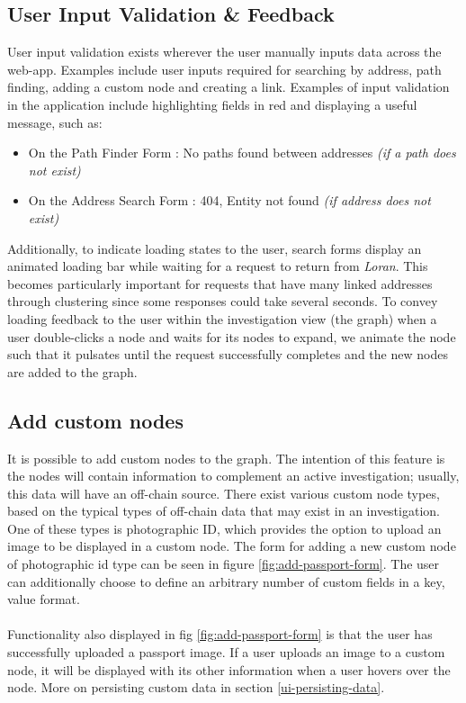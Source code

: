 \subsection{User Input Validation \& Feedback}
User input validation exists wherever the user manually inputs data across the web-app. Examples include user inputs required for searching by address, path finding, adding a custom node and creating a link. Examples of input validation in the application include highlighting fields in red and displaying a useful message, such as:
\begin{itemize}
    \item On the Path Finder Form : No paths found between addresses \textit{(if a path does not exist)}
    \item On the Address Search Form : 404, Entity not found \textit{(if address does not exist)}
\end{itemize}

Additionally, to indicate loading states to the user, search forms display an animated loading bar while waiting for a request to return from \textit{Loran}. This becomes particularly important for requests that have many linked addresses through clustering since some responses could take several seconds. To convey loading feedback to the user within the investigation view (the graph) when a user double-clicks a node and waits for its nodes to expand, we animate the node such that it pulsates until the request successfully completes and the new nodes are added to the graph. 

\subsection{Add custom nodes}
It is possible to add custom nodes to the graph. The intention of this feature is the nodes will contain information to complement an active investigation; usually, this data will have an off-chain source. There exist various custom node types, based on the typical types of off-chain data that may exist in an investigation. One of these types is photographic ID, which provides the option to upload an image to be displayed in a custom node. The form for adding a new custom node of photographic id type can be seen in figure \ref{fig:add-passport-form}. The user can additionally choose to define an arbitrary number of custom fields in a key, value format. 
\\\\
Functionality also displayed in fig \ref{fig:add-passport-form} is that the user has successfully uploaded a passport image.  If a user uploads an image to a custom node, it will be displayed with its other information when a user hovers over the node. More on persisting custom data in section \ref{ui-persisting-data}.

